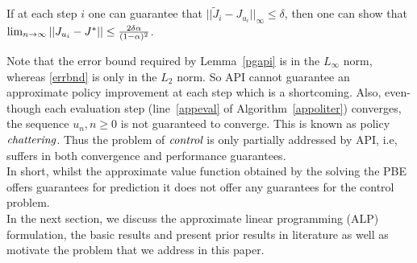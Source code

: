 \begin{lemma}\label{pgapi}
If at each step $i$ one can guarantee that $||\tilde{J}_i-J_{u_i}||_\infty\leq \delta$, then one can show that $\lim_{n\rightarrow\infty}||J_{u_i}-J^*||\leq \frac{2\delta\alpha}{(1-\alpha)^2}$.
\end{lemma}
Note that the error bound required by Lemma~\ref{pgapi} is in the $L_\infty$ norm, whereas \eqref{errbnd} is only in the $L_2$ norm. So API cannot guarantee an approximate policy improvement at each step which is a shortcoming. Also, even-though each evaluation step (line~\ref{appeval} of Algorithm~\ref{appoliter}) converges, the sequence ${u_n}, n\geq0$ is not guaranteed to converge. This is known as policy $\emph{chattering}$. Thus the problem of $\emph{control}$ is only partially addressed by API, i.e, suffers in both convergence and performance guarantees. \\
In short, whilst the approximate value function obtained by the solving the PBE offers guarantees for prediction it does not offer any guarantees for the control problem. \\
In the next section, we discuss the approximate linear programming (ALP) formulation, the basic results and present prior results in literature as well as motivate the problem that we address in this paper. 

